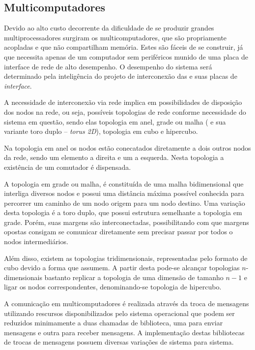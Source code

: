 \subsection{Multicomputadores}
\label{subsec:multicomputadores}

Devido ao alto custo decorrente da dificuldade de se produzir grandes multiprocessadores surgiram os multicomputadores, que são \cpus propriamente acopladas e que não compartilham memória. Estes são fáceis de se construir, já que necessita apenas de um computador sem periféricos munido de uma placa de interface de rede de alto desempenho. O desempenho do sistema será determinado pela inteligência do projeto de interconexão das \cpus e suas placas de \textit{interface}.

A necessidade de interconexão via rede implica em possibilidades de disposição dos nodos na rede, ou seja, possíveis topologias de rede conforme necessidade do sistema em questão, sendo elas topologia em anel, grade ou malha ( e sua variante toro duplo -- \textit{torus 2D}), topologia em cubo e hipercubo.

Na topologia em anel os nodos estão conecatados diretamente a dois outros nodos da rede, sendo um elemento a direita e um a esquerda. Nesta topologia a existência de um comutador é dispensada.

A topologia em grade ou malha, é constituída de uma malha bidimensional que interliga diversos nodos e possui uma distância máxima possível conhecida para percorrer um caminho de um nodo origem para um nodo destino. Uma variação desta topologia é a toro duplo, que possui estrutura semelhante a topologia em grade. Porém, suas margens são interconectadas, possibilitando com que margens opostas consigam se comunicar diretamente sem precisar passar por todos o nodos intermediários.

Além disso, existem as topologias tridimensionais, representadas pelo formato de cubo devido a forma que assumem. A partir desta pode-se alcançar topologias $n$-dimensionais bastanto replicar a topologia de uma dimensão de tamanho $n-1$ e ligar os nodos correspondentes, denominando-se topologia de hipercubo.

A comunicação em multicomputadores é realizada através da troca de mensagens utilizando rescursos disponibilizados pelo sistema operacional que podem ser reduzidos minimamente a duas chamadas de biblioteca, uma para enviar mensagens e outra para receber mensagens. A implementação destas bibliotecas de trocas de mensagens possuem diversas variações de sistema para sistema. 

